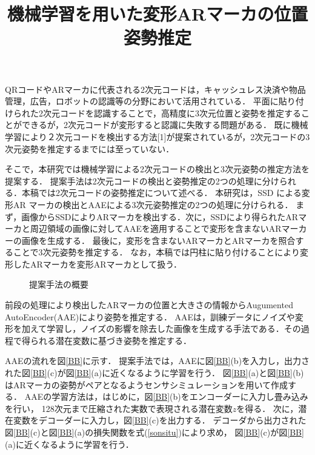 \documentclass{jsarticle}
\title{機械学習を用いた変形ARマーカの位置姿勢推定}
\begin{document}
\maketitle

QRコードやARマーカに代表される2次元コードは，キャッシュレス決済や物品管理，広告，ロボットの認識等の分野において活用されている．
平面に貼り付けられた2次元コードを認識することで，高精度に3次元位置と姿勢を推定することができるが，2次元コードが変形すると認識に失敗する問題がある．
既に機械学習により２次元コードを検出する方法[1]が提案されているが，2次元コードの3次元姿勢を推定するまでには至っていない．

そこで，本研究では機械学習による2次元コードの検出と3次元姿勢の推定方法を提案する．
提案手法は2次元コードの検出と姿勢推定の2つの処理に分けられる．本稿では2次元コードの姿勢推定について述べる．
本研究は，SSD による変形AR マーカの検出とAAEによる3次元姿勢推定の2つの処理に分けられる．
まず，画像からSSDによりARマーカを検出する．次に，SSDにより得られたARマーカと周辺領域の画像に対してAAEを適用することで変形を含まないARマーカーの画像を生成する．
最後に，変形を含まないARマーカとARマーカを照合することで3次元姿勢を推定する．
なお，本稿では円柱に貼り付けることにより変形したARマーカを変形ARマーカとして扱う．

\begin{figure}[ht]
\vspace{0zh}
\setlength{\epsfxsize}{7.5cm}
\centerline{}
\vspace{-1zh}
\caption{提案手法の概要}
\label{flow}
\vspace{-2zh}
\end{figure}

前段の処理により検出したARマーカの位置と大きさの情報からAugumented AutoEncoder(AAE)により姿勢を推定する．
AAEは，訓練データにノイズや変形を加えて学習し，ノイズの影響を除去した画像を生成する手法である．その過程で得られる潜在変数に基づき姿勢を推定する．

AAEの流れを図\ref{BB}に示す．
提案手法では，AAEに図\ref{BB}(b)を入力し，出力された図\ref{BB}(c)が図\ref{BB}(a)に近くなるように学習を行う．
図\ref{BB}(a)と図\ref{BB}(b)はARマーカの姿勢がペアとなるようセンサシミュレーションを用いて作成する．
AAEの学習方法は，はじめに，図\ref{BB}(b)をエンコーダーに入力し畳み込みを行い，
128次元まで圧縮された実数で表現される潜在変数$z$を得る．
次に，潜在変数をデコーダーに入力し，図\ref{BB}(c)を出力する．
デコーダから出力された図\ref{BB}(c)と図\ref{BB}(a)の損失関数を式(\ref{sonsitu})により求め，
図\ref{BB}(c)が図\ref{BB}(a)に近くなるように学習を行う．
\end{document}
